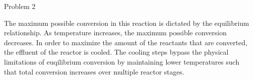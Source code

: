 \item Problem 2

The maximum possible conversion in this reaction is dictated by the equilibrium relationship. As temperature increases, the maximum possible conversion decreases. In order to maximize the amount of the reactants that are converted, the effluent of the reactor is cooled. The cooling steps bypass the physical limitations of euqilibrium conversion by maintaining lower temperatures such that total conversion increases over multiple reactor stages.